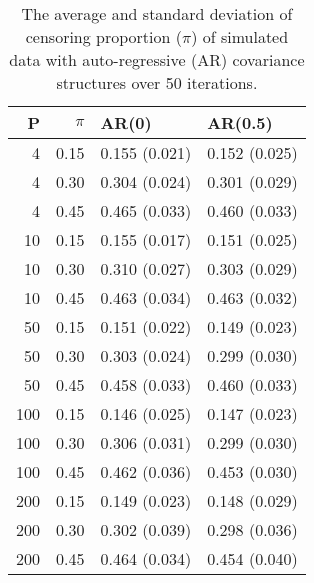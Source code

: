 \begin{table}[ht]
\centering
\caption{The average and standard deviation of censoring proportion ($\pi$) of simulated data with auto-regressive (AR) covariance structures over 50 iterations.} 
\label{tab:sim_cnr_prop}
\begin{tabular}{rrll}
  \hline
  P & $\pi$ & AR(0) & AR(0.5) \\ 
  \hline
  4 & 0.15 & 0.155 (0.021) & 0.152 (0.025) \\ 
    4 & 0.30 & 0.304 (0.024) & 0.301 (0.029) \\ 
    4 & 0.45 & 0.465 (0.033) & 0.460 (0.033) \\ 
   10 & 0.15 & 0.155 (0.017) & 0.151 (0.025) \\ 
   10 & 0.30 & 0.310 (0.027) & 0.303 (0.029) \\ 
   10 & 0.45 & 0.463 (0.034) & 0.463 (0.032) \\ 
   50 & 0.15 & 0.151 (0.022) & 0.149 (0.023) \\ 
   50 & 0.30 & 0.303 (0.024) & 0.299 (0.030) \\ 
   50 & 0.45 & 0.458 (0.033) & 0.460 (0.033) \\ 
  100 & 0.15 & 0.146 (0.025) & 0.147 (0.023) \\ 
  100 & 0.30 & 0.306 (0.031) & 0.299 (0.030) \\ 
  100 & 0.45 & 0.462 (0.036) & 0.453 (0.030) \\ 
  200 & 0.15 & 0.149 (0.023) & 0.148 (0.029) \\ 
  200 & 0.30 & 0.302 (0.039) & 0.298 (0.036) \\ 
  200 & 0.45 & 0.464 (0.034) & 0.454 (0.040) \\ 
   \hline
\end{tabular}
\end{table}
